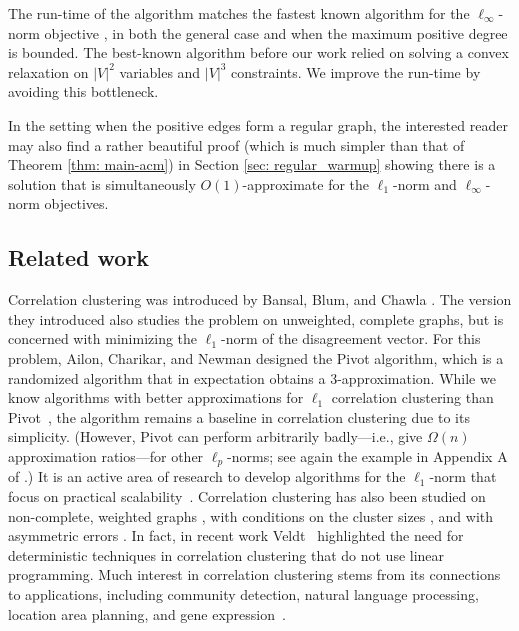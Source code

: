 \documentclass[11pt]{article}
\begin{document}
The run-time of the algorithm matches the fastest known algorithm for the $\ell_\infty$-norm objective \cite{DMN23}, 
in both the general case and when the maximum positive degree is bounded.
The best-known algorithm before our work relied on solving a convex relaxation on $|V|^2$ variables and $|V|^3$ constraints.
We improve the run-time by avoiding this bottleneck.

In the setting when the positive edges form a regular graph, 
the interested reader may also find a rather beautiful proof (which is much simpler than that of Theorem \ref{thm: main-acm}) in Section \ref{sec: regular_warmup} showing there is a solution that is simultaneously $O(1)$-approximate for the $\ell_1$-norm and $\ell_{\infty}$-norm objectives.

\subsection{Related work}
\label{sec:related}
Correlation clustering was introduced by 
Bansal, Blum, and Chawla \citeyearpar{BBC04}.
The version they introduced also studies the problem on unweighted, complete graphs, but is concerned with minimizing the $\ell_1$-norm of the disagreement vector.
For this problem, Ailon, Charikar, and Newman \citeyearpar{ACN-pivot} designed the Pivot algorithm, which is a randomized algorithm that in expectation obtains a 3-approximation.
While we know algorithms with better approximations for $\ell_1$ correlation clustering than Pivot~\cite{chawla2015near, cohen2022correlation}, 
the algorithm remains a baseline in correlation clustering due to its simplicity. (However, Pivot can perform arbitrarily badly---i.e., give $\Omega(n)$ approximation ratios---for other $\ell_p$-norms; see again the example in Appendix A of \cite{PM16}.)
It is an active area of research to develop algorithms for the $\ell_1$-norm that focus on practical scalability~\cite{bonchi2014, chierichetti2014, pan2014scaling, SDELM21, single-pass2023}. 
Correlation clustering has also been studied on non-complete, weighted graphs \cite{CGS17, KMZ19}, with conditions on the cluster sizes \cite{puleo2015correlation}, and with asymmetric errors \cite{JafarovKMM21}. 
In fact, in recent work Veldt~\cite{veldt2022correlation} highlighted the need for deterministic techniques in correlation clustering that do not use linear programming.
Much interest in correlation clustering stems from its connections to applications,
including community detection, natural language processing, location area planning, and gene expression~\cite{veldt2018, SDELM21, Wirth17, mccallum2004conditional, ben1999clustering, demaine2003correlation}.
\end{document}
